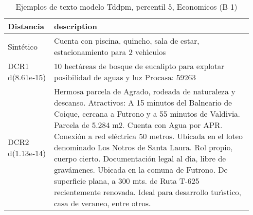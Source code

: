 \begin{table}[H]
\centering
\fontsize{10}{14}\selectfont
\caption{Ejemplos de texto modelo Tddpm, percentil 5, Economicos (B-1)}
\label{table-example-economicos-b-1-tddpm_mlp-5p-text}
\begin{tabular}{|l|m{35em}|}
\hline
\rowcolor[gray]{0.8}
Distancia & description \\
\hline Sintético & Cuenta con piscina, quincho, sala de estar, estacionamiento para 2 veh{\'\i}culos \\
\hline DCR1 d(8.61e-15) & 10 hect\'areas de bosque de eucalipto para explotar  posibilidad de aguas y luz  Procasa: 59263 \\
\hline DCR2 d(1.13e-14) & Hermosa parcela de Agrado, rodeada de naturaleza y descanso.  Atractivos: A 15 minutos del Balneario de Coique, cercana a Futrono y a 55 minutos de Valdivia. Parcela de 5.284 m2. Cuenta con Agua por APR. Conexi\'on a red el\'ectrica 50 metros. Ubicada en el loteo denominado Los Notros de Santa Laura. Rol propio, cuerpo cierto. Documentaci\'on legal al d{\'\i}a, libre de grav\'amenes. Ubicada en la comuna de Futrono. De superficie plana, a 300 mts. de Ruta T-625 recientemente renovada.  Ideal para desarrollo tur{\'\i}stico, casa de veraneo, entre otros. \\
\hline
\end{tabular}
\end{table}
